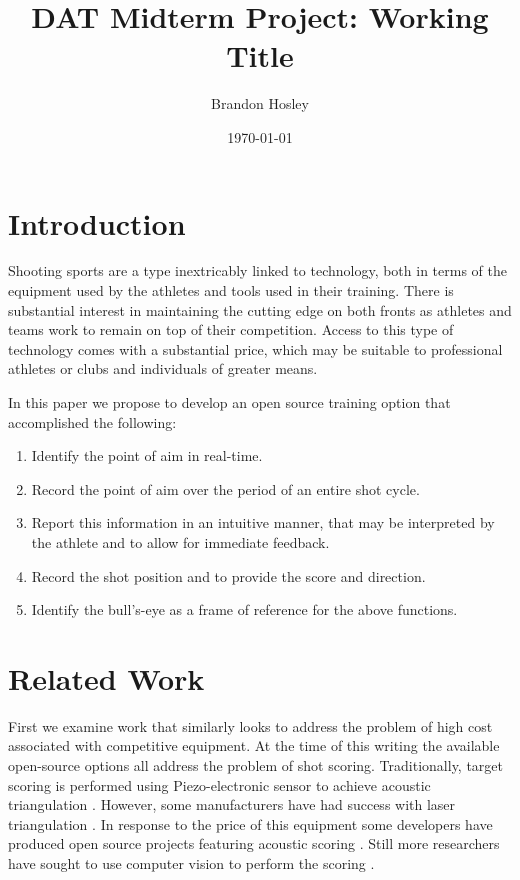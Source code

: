 \documentclass[conference]{IEEEtran}
\title{DAT Midterm Project: Working Title}
\author{Brandon Hosley}
\date{\today}
\begin{document}
	\maketitle
	
\section{Introduction}

Shooting sports are a type inextricably linked to technology, 
both in terms of the equipment used by the athletes and tools used in their training.
There is substantial interest in maintaining the cutting edge on both fronts as athletes and teams work to remain on top of their competition.
Access to this type of technology comes with a substantial price, which may be suitable to professional athletes or clubs and individuals of greater means.


In this paper we propose to develop an open source training option that accomplished the following:

\begin{enumerate}
	\item Identify the point of aim in real-time.
	\item Record the point of aim over the period of an entire shot cycle.
	\item Report this information in an intuitive manner, that may be interpreted by the athlete and to allow for immediate feedback.
	
	\item Record the shot position and to provide the score and direction.
	\item Identify the bull's-eye as a frame of reference for the above functions.
\end{enumerate}






\section{Related Work}


First we examine work that similarly looks to address the problem of high cost associated with competitive equipment.
At the time of this writing the available open-source options all address the problem of shot scoring.
Traditionally, target scoring is performed using Piezo-electronic sensor to achieve acoustic triangulation \cite{Anderson2018}.
However, some manufacturers have had success with laser triangulation \cite{SUIS}.
In response to the price of this equipment some developers have produced open source projects featuring acoustic scoring \cite{etarg} \cite{freetarget}.
Still more researchers have sought to use computer vision to perform the scoring \cite{Rudzinski2012} \cite{Stenhager2021}.
\end{document}
